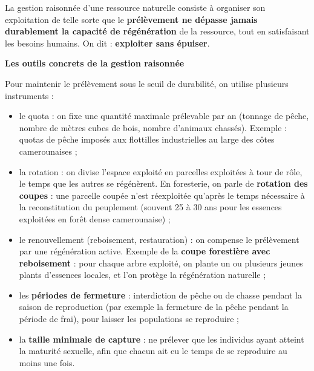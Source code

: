\documentclass[11pt]{article}
\newcommand{\cle}[1]{{\popxbold\color{popdark}#1}}
\begin{document}
\begin{definition}
La \cle{gestion raisonnée} d'une ressource naturelle consiste à organiser son exploitation de telle sorte que le \textbf{prélèvement ne dépasse jamais durablement la capacité de régénération} de la ressource, tout en satisfaisant les besoins humains. On dit : \textbf{exploiter sans épuiser}.
\end{definition}

\textbf{Les outils concrets de la gestion raisonnée}\par

Pour maintenir le prélèvement sous le seuil de durabilité, on utilise plusieurs instruments :

\begin{itemize}
\item le \cle{quota} : on fixe une quantité maximale prélevable par an (tonnage de pêche, nombre de mètres cubes de bois, nombre d'animaux chassés). Exemple : quotas de pêche imposés aux flottilles industrielles au large des côtes camerounaises ;
\item la \cle{rotation} : on divise l'espace exploité en parcelles exploitées à tour de rôle, le temps que les autres se régénèrent. En foresterie, on parle de \textbf{rotation des coupes} : une parcelle coupée n'est réexploitée qu'après le temps nécessaire à la reconstitution du peuplement (souvent 25 à 30 ans pour les essences exploitées en forêt dense camerounaise) ;
\item le \cle{renouvellement} (reboisement, restauration) : on compense le prélèvement par une régénération active. Exemple de la \textbf{coupe forestière avec reboisement} : pour chaque arbre exploité, on plante un ou plusieurs jeunes plants d'essences locales, et l'on protège la régénération naturelle ;
\item les \textbf{périodes de fermeture} : interdiction de pêche ou de chasse pendant la saison de reproduction (par exemple la fermeture de la pêche pendant la période de frai), pour laisser les populations se reproduire ;
\item la \textbf{taille minimale de capture} : ne prélever que les individus ayant atteint la maturité sexuelle, afin que chacun ait eu le temps de se reproduire au moins une fois.
\end{itemize}
\end{document}
